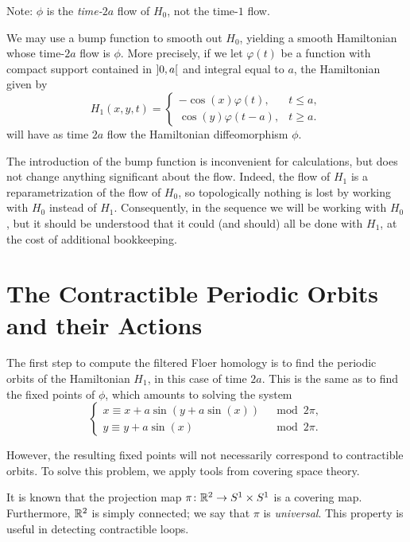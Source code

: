 Note: $\phi$ is the \emph{time-$2a$} flow of $H_0$, not the time-$1$ flow.

We may use a bump function to smooth out $H_0$, yielding a smooth Hamiltonian whose time-$2a$ flow is $\phi$. More precisely, if we let $\varphi(t)$ be a function with compact support contained in $\ointerval 0 a$ and integral equal to $a$, the Hamiltonian given by
\begin{equation}
\label{h1def}
H_1(x,y,t) = \begin{cases}
-\cos(x) \varphi(t), & t \leq a,\\
\cos(y) \varphi(t-a), & t \geq a.
\end{cases}
\end{equation}
will have as time $2a$ flow the Hamiltonian diffeomorphism $\phi$.

\begin{remark}\label{rmk:bump}
The introduction of the bump function is inconvenient for calculations, but does not change anything significant about the flow. Indeed, the flow of $H_1$ is a reparametrization of the flow of $H_0$, so topologically nothing is lost by working with $H_0$ instead of $H_1$. Consequently, in the sequence we will be working with $H_0$, but it should be understood that it could (and should) all be done with $H_1$, at the cost of additional bookkeeping.
\end{remark}

\section{The Contractible Periodic Orbits and their Actions}

The first step to compute the filtered Floer homology is to find the periodic orbits of the Hamiltonian $H_1$, in this case of time $2a$. This is the same as to find the fixed points of $\phi$, which amounts to solving the system
\begin{equation}\label{eq:fpphi1}
\begin{cases}
x \equiv x + a \sin(y + a \sin(x)) &\mod 2\pi,\\
y \equiv y + a \sin(x) &\mod 2\pi.
\end{cases}
\end{equation}

However, the resulting fixed points will not necessarily correspond to contractible orbits. To solve this problem, we apply tools from covering space theory.

It is known that the projection map $\pi \colon \mathbb{R}^2 \to S^1 \times S^1$ is a covering map. Furthermore, $\mathbb{R}^2$ is simply connected; we say that $\pi$ is \emph{universal}. This property is useful in detecting contractible loops.

